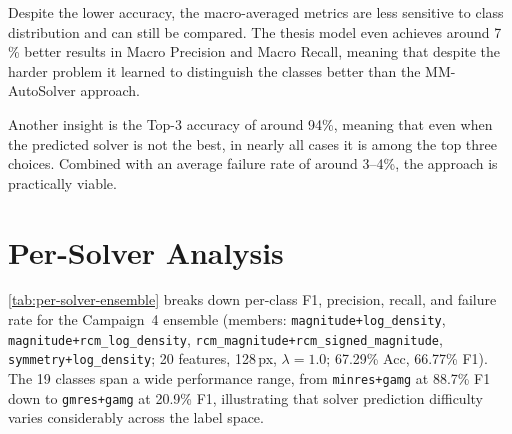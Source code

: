 Despite the lower accuracy, the macro-averaged metrics are less sensitive to class distribution and can still be compared.
The thesis model even achieves around 7\,\% better results in Macro Precision and Macro Recall, meaning that despite the harder
problem it learned to distinguish the classes better than the MM-AutoSolver approach.

Another insight is the Top-3 accuracy of around 94\%, meaning that even when the predicted solver is not the best,
in nearly all cases it is among the top three choices.
Combined with an average failure rate of around 3--4\%, the approach is practically viable.

\section{Per-Solver Analysis}\label{sec:per-solver}

\autoref{tab:per-solver-ensemble} breaks down per-class F1, precision, recall, and failure rate
for the Campaign~4 ensemble (members: \texttt{magnitude+log\_density},
\texttt{magnitude+rcm\_log\_density}, \texttt{rcm\_magnitude+rcm\_signed\_magnitude},
\texttt{symmetry+log\_density}; 20 features, 128\,px, $\lambda=1.0$; 67.29\% Acc, 66.77\% F1).
The 19 classes span a wide performance range, from \texttt{minres+gamg} at 88.7\% F1 down to
\texttt{gmres+gamg} at 20.9\% F1, illustrating that solver prediction difficulty varies
considerably across the label space.


